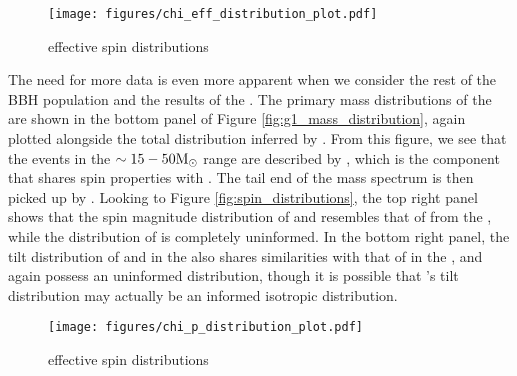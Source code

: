 \begin{figure}[hb]
    \begin{centering}
        \texttt{[image: figures/chi\_eff\_distribution\_plot.pdf]}
        \caption{effective spin distributions}
        \label{fig:chi_eff_distributions}
    \end{centering}
\end{figure}


The need for more data is even more apparent when we consider the rest of the BBH population and the results of the \comp{}. The primary mass distributions of the \comp{} are shown in the bottom panel of Figure \ref{fig:g1_mass_distribution}, again plotted alongside the total distribution inferred by \brucepaper{}. From this figure, we see that the events in the $\sim15-50 {\rm M}_\odot$ range are described by \contA{}, which is the component that shares spin properties with \first{}. The tail end of the mass spectrum is then picked up by \contB{}. Looking to Figure \ref{fig:spin_distributions}, the top right panel shows that the spin magnitude distribution of \first{} and \contA{} resembles that of \first{} from the \base{}, while the distribution of \contB{} is completely uninformed. In the bottom right panel, the tilt distribution of \first{} and \contA{} in the \comp{} also shares similarities with that of \first{} in the \base{}, and again \contB{} possess an uninformed distribution, though it is possible that \contB{}'s tilt distribution may actually be an informed isotropic distribution.

\begin{figure}[ht!]
    \begin{centering}
        \texttt{[image: figures/chi\_p\_distribution\_plot.pdf]}
        \caption{effective spin distributions}
        \label{fig:chi_p_distributions}
    \end{centering}
\end{figure}

